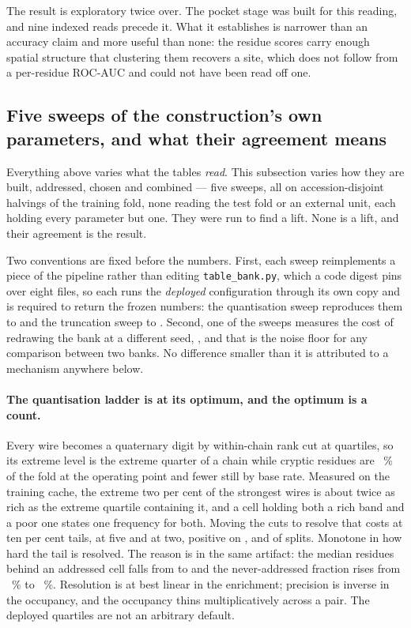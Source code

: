 \documentclass[11pt]{article}
\begin{document}
The result is exploratory twice over. The pocket stage was built for this reading,
and nine indexed reads precede it. What it establishes is narrower than an
accuracy claim and more useful than none: the residue scores carry enough spatial
structure that clustering them recovers a site, which does not follow from a
per-residue ROC-AUC and could not have been read off one.

\subsection{Five sweeps of the construction's own parameters, and what their
agreement means}
\label{sec:saturation}
Everything above varies what the tables \emph{read}. This subsection varies how
they are built, addressed, chosen and combined --- five sweeps, all on
\LadderSplits{} accession-disjoint halvings of the training fold, none reading the
test fold or an external unit, each holding every parameter but one. They were run
to find a lift. None is a lift, and their agreement is the result.

Two conventions are fixed before the numbers. First, each sweep reimplements a
piece of the pipeline rather than editing \texttt{table\_bank.py}, which a code
digest pins over eight files, so each runs the \emph{deployed} configuration
through its own copy and is required to return the frozen numbers: the
quantisation sweep reproduces them to \LadderRepro{} and the truncation sweep to
\TruncRepro{}. Second, one of the sweeps measures the cost of redrawing the bank
at a different seed, \SatReseed{}, and that is the noise floor for any comparison
between two banks. No difference smaller than it is attributed to a mechanism
anywhere below.

\paragraph{The quantisation ladder is at its optimum, and the optimum is a
count.} Every wire becomes a quaternary digit by within-chain rank cut at
quartiles, so its extreme level is the extreme quarter of a chain while cryptic
residues are \AlgOperatingPct{}~\% of the fold at the operating point and fewer
still by base rate. Measured on the training cache, the extreme two per cent of
the strongest wires is about twice as rich as the extreme quartile containing it,
and a cell holding both a rich band and a poor one states one frequency for both.
Moving the cuts to resolve that costs \LadderTailTen{} at ten per cent tails,
\LadderTailFive{} at five and \LadderTailTwo{} at two, positive on
\LadderTailTenSplits{}, \LadderTailFiveSplits{} and \LadderTailTwoSplits{} of
\LadderSplits{} splits. Monotone in how hard the tail is resolved. The reason is
in the same artifact: the median residues behind an addressed cell falls from
\LadderCellsDeployed{} to \LadderCellsTwo{} and the never-addressed fraction rises
from \LadderEmptyDeployed{}~\% to \LadderEmptyTwo{}~\%. Resolution is at best
linear in the enrichment; precision is inverse in the occupancy, and the occupancy
thins multiplicatively across a pair. The deployed quartiles are not an arbitrary
default.
\end{document}
